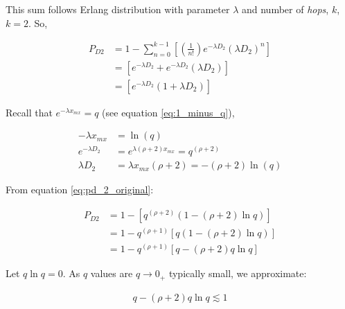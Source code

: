     This sum follows Erlang distribution with parameter $\lambda$ and number of \emph{hops}, $k$, $k = 2$.  So,
    
    \begin{equation}
        \label{eq:pd_2_original}
        \begin{split}
                P_{D2} &= 1 - \sum\limits_{n=0}^{k-1}\left[ \left(\frac{1}{n!}\right) e^{-\lambda D_2} \left( \lambda D_2 \right)^n  \right] \\
                &=    \left[ e^{-\lambda D_2} + e^{-\lambda D_2}\left( \lambda D_2 \right)     \right] \\
                &=    \left[ e^{-\lambda D_2} \left( 1 + \lambda D_2 \right)    \right]
        \end{split}
    \end{equation}
        
        Recall that $e^{-\lambda x_{mx}} = q$ (see equation \ref{eq:1_minus_q}),
        
        \begin{equation}
        \begin{split}
               -\lambda x_{mx} &= \ln(q) \\
               e^{-\lambda D_2} &= e^{\lambda (\rho + 2) x_{mx}} = q^{(\rho+2)} \\
               \lambda D_2 &= \lambda x_{mx} (\rho + 2) = - (\rho + 2) \ln(q)
        \end{split}
    \end{equation}
            
    From equation \ref{eq:pd_2_original}:
    
    \begin{equation}
        \label{eq:pd_2_second}
        \begin{split}
                P_{D2} &= 1 - \left[ q ^{(\rho + 2)} \left( 1 - (\rho + 2) \ln q \right)   \right] \\
                           &=  1 - q^{(\rho + 1)} \left[ q \left( 1 - (\rho + 2) \ln q  \right) \right] \\
                           &= 1- q^{(\rho + 1)} \left[ q - (\rho + 2) q \ln q \right]
        \end{split}
    \end{equation}
    
    Let $q \ln q = 0$.  As $q$ values are $q \rightarrow 0_+$ typically small, we approximate:
    
    \begin{equation}
        \begin{aligned}
                q - (\rho + 2) q \ln q \lesssim 1
            \end{aligned}
        \end{equation}
    

